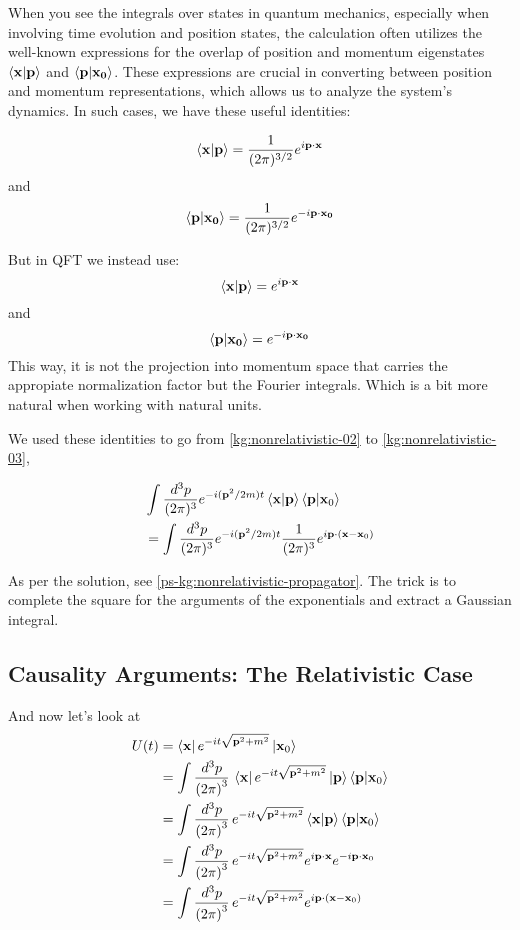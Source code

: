 When you see the integrals over states in quantum mechanics, especially when involving time evolution and position states,
the calculation often utilizes the well-known expressions for the overlap of position and momentum eigenstates
$\braket{\boldsymbol{\mathbf{x}} | \boldsymbol{\mathbf{p}}}$ and $\braket{\boldsymbol{\mathbf{p}} | \boldsymbol{\mathbf{x_0}}}$.
These expressions are crucial in converting between position and momentum representations,
which allows us to analyze the system's dynamics.
In such cases, we have these useful identities:

$$
\braket{\boldsymbol{\mathbf{x}} | \boldsymbol{\mathbf{p}}} = \frac{1}{(2\pi)^{3/2}} e^{i\boldsymbol{\mathbf{p}}\cdot\boldsymbol{\mathbf{x}}}
$$
and 
$$
\braket{\boldsymbol{\mathbf{p}} | \boldsymbol{\mathbf{x_0}}} = \frac{1}{(2\pi)^{3/2}} e^{-i\boldsymbol{\mathbf{p}}\cdot\boldsymbol{\mathbf{x_0}}}
$$

But in QFT we instead use:
$$
\braket{\boldsymbol{\mathbf{x}} | \boldsymbol{\mathbf{p}}} = e^{i\boldsymbol{\mathbf{p}}\cdot\boldsymbol{\mathbf{x}}}
$$
and 
$$
\braket{\boldsymbol{\mathbf{p}} | \boldsymbol{\mathbf{x_0}}} = e^{-i\boldsymbol{\mathbf{p}}\cdot\boldsymbol{\mathbf{x_0}}}
$$
This way, it is not the projection into momentum space that carries the appropiate normalization factor
but the Fourier integrals.
Which is a bit more natural when working with natural units.


We used these identities to go from \ref{kg:nonrelativistic-02} to \ref{kg:nonrelativistic-03},

\begin{align*}
& \int \frac{d^3p}{(2\pi)^3} e^{-i(\boldsymbol{\mathbf{p}}^2/2m)t} \braket{\boldsymbol{\mathbf{x}} | \boldsymbol{\mathbf{p}}} \braket{\boldsymbol{\mathbf{p}} | \boldsymbol{\mathbf{x}}_0} \\
&= \int \frac{d^3p}{(2\pi)^3} e^{-i(\boldsymbol{\mathbf{p}}^2/2m)t} \frac{1}{(2\pi)^3} e^{i\boldsymbol{\mathbf{p}}\cdot(\boldsymbol{\mathbf{x}}-\boldsymbol{\mathbf{x}}_0)} 
\end{align*}


As per the solution, see \ref{ps-kg:nonrelativistic-propagator}.
The trick is to complete the square for the arguments of the exponentials and extract a Gaussian integral.





\subsection{Causality Arguments: The Relativistic Case}

And now let's look at
\begin{align*}
U(t) &= \bra{\boldsymbol{\mathbf{x}}} e^{-it\sqrt{\boldsymbol{\mathbf{p}}^2 + m^2}} \ket{\boldsymbol{\mathbf{x}}_0} \\
&= \int \frac{d^3p}{\left(2\pi\right)^3} \, \bra{\boldsymbol{\mathbf{x}}} e^{-it\sqrt{\boldsymbol{\mathbf{p}}^2 + m^2}} \ket{\boldsymbol{\mathbf{p}}} \braket{\boldsymbol{\mathbf{p}} | \boldsymbol{\mathbf{x}}_0} \\
&= \int \frac{d^3p}{\left(2\pi\right)^3} \, e^{-it\sqrt{\boldsymbol{\mathbf{p}}^2 + m^2}} \braket{\boldsymbol{\mathbf{x}} | \boldsymbol{\mathbf{p}}} \braket{\boldsymbol{\mathbf{p}} | \boldsymbol{\mathbf{x}}_0} \\
&= \int \frac{d^3p}{\left(2\pi\right)^3} \, e^{-it\sqrt{\boldsymbol{\mathbf{p}}^2 + m^2}} e^{i\boldsymbol{\mathbf{p}}\cdot\boldsymbol{\mathbf{x}}} e^{-i\boldsymbol{\mathbf{p}}\cdot\boldsymbol{\mathbf{x}}_0} \\
&= \int \frac{d^3p}{\left(2\pi\right)^3} \, e^{-it\sqrt{\boldsymbol{\mathbf{p}}^2 + m^2}} e^{i\boldsymbol{\mathbf{p}}\cdot(\boldsymbol{\mathbf{x}} - \boldsymbol{\mathbf{x}}_0)} \\
\end{align*}


